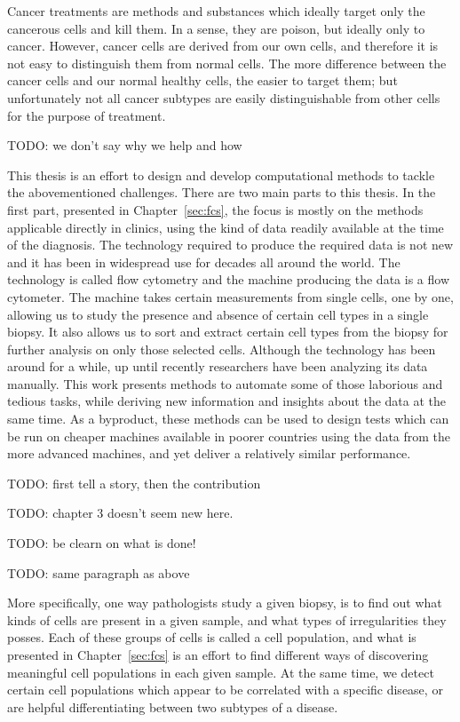 Cancer treatments are methods and substances which ideally target only the
cancerous cells and kill them. In a sense, they are poison, but ideally only to
cancer. However, cancer cells are derived from our own cells, and therefore it
is not easy to distinguish them from normal cells. The more difference between
the cancer cells and our normal healthy cells, the easier to target them; but
unfortunately not all cancer subtypes are easily distinguishable from other
cells for the purpose of treatment.

TODO: we don't say why we help and how

This thesis is an effort to design and develop computational methods to tackle
the abovementioned challenges. There are two main parts to this thesis. In the
first part, presented in Chapter~\ref{sec:fcs}, the focus is mostly on the
methods applicable directly in clinics, using the kind of data readily available
at the time of the diagnosis. The technology required to produce the required
data is not new and it has been in widespread use for decades all around the
world. The technology is called flow cytometry and the machine producing the
data is a flow cytometer. The machine takes certain measurements from single
cells, one by one, allowing us to study the presence and absence of certain cell
types in a single biopsy. It also allows us to sort and extract certain cell
types from the biopsy for further analysis on only those selected cells.
Although the technology has been around for a while, up until recently
researchers have been analyzing its data manually. This work presents methods to
automate some of those laborious and tedious tasks, while deriving new
information and insights about the data at the same time. As a byproduct, these
methods can be used to design tests which can be run on cheaper machines
available in poorer countries using the data from the more advanced machines,
and yet deliver a relatively similar performance.

TODO: first tell a story, then the contribution

TODO: chapter 3 doesn't seem new here.

TODO: be clearn on what is done!

TODO: same paragraph as above

More specifically, one way pathologists study a given biopsy, is to find out
what kinds of cells are present in a given sample, and what types of
irregularities they posses. Each of these groups of cells is called a cell
population, and what is presented in Chapter~\ref{sec:fcs} is an effort to find
different ways of discovering meaningful cell populations in each given sample.
At the same time, we detect certain cell populations which appear to be
correlated with a specific disease, or are helpful differentiating between
two subtypes of a disease.

